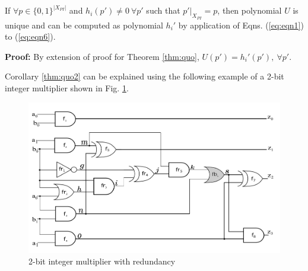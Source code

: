 \begin{Corollary}
\label{thm:quo2}
If $\forall p \in \{0,1\}^{|X_{PI}|}$ and $h_i(p') \neq 0\ \forall p'$ such that $p'|_{X_{PI}} = p$, then polynomial $U$ is unique and can be computed as polynomial $h_i'$ by application of Eqns. (\ref{eq:eqn1}) to (\ref{eq:eqn6}). 
\end{Corollary}

\textbf{Proof:} By extension of proof for Theorem \ref{thm:quo}, $U(p') = h_i'(p'),\ \forall p'$.

Corollary \ref{thm:quo2} can be explained using the following example of a 2-bit integer multiplier shown in Fig. \ref{fig:2mult}.

\begin{figure}[H]
    \centering
    \includegraphics[scale = 0.25]{int_mul_red_b.png}
    \caption{2-bit integer multiplier with redundancy}
    \label{fig:2mult}
\end{figure}
